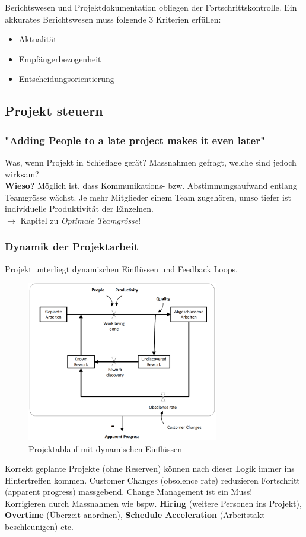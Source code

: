 \documentclass[a4paper]{article}
\begin{document}
		Berichtswesen und Projektdokumentation obliegen der Fortschrittskontrolle.
		Ein akkurates Berichtswesen muss folgende 3 Kriterien erfüllen:
			\begin{itemize}
				\item Aktualität
				\item Empfängerbezogenheit
				\item Entscheidungsorientierung
			\end{itemize}
	
\newpage

	\subsection{Projekt steuern}
	
		\subsubsection{"Adding People to a late project makes it even later"}
		
		Was, wenn Projekt in Schieflage gerät?
		Massnahmen gefragt, welche sind jedoch wirksam?\\
		\textbf{Wieso?} Möglich ist, dass Kommunikations- bzw. Abstimmungsaufwand entlang Teamgrösse wächst.
		Je mehr Mitglieder einem Team zugehören, umso tiefer ist individuelle Produktivität der Einzelnen.\\
		$\rightarrow$ Kapitel zu \textit{Optimale Teamgrösse}!
		
		\subsubsection{Dynamik der Projektarbeit}
		
		Projekt unterliegt dynamischen Einflüssen und Feedback Loops.
		
		\begin{figure}[!htb]
			\centering
			\includegraphics[height=7cm]{img/pm/dynamik_01.png}
			\caption{Projektablauf mit dynamischen Einflüssen}
			\label{fig:pm_dynamik_01}
		\end{figure}
		\noindent
		Korrekt geplante Projekte (ohne Reserven) können nach dieser Logik immer ins Hintertreffen kommen.
		Customer Changes (obsolence rate) reduzieren Fortschritt (apparent progress) massgebend.
		Change Management ist ein Muss!\\
		Korrigieren durch Massnahmen wie bspw. \textbf{Hiring} (weitere Personen ins Projekt), \textbf{Overtime} (Überzeit anordnen), \textbf{Schedule Acceleration} (Arbeitstakt beschleunigen) etc.
		
\end{document}
